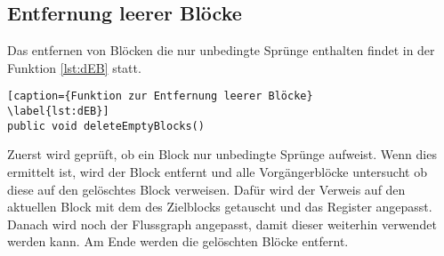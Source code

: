 \documentclass[a4paper]{article}
\begin{document}
\subsection{Entfernung leerer Blöcke}
Das entfernen von Blöcken die nur unbedingte Sprünge enthalten findet in der Funktion \ref{lst:dEB} statt.
\begin{lstlisting}[caption={Funktion zur Entfernung leerer Blöcke}
\label{lst:dEB}]
public void deleteEmptyBlocks()
\end{lstlisting}
Zuerst wird geprüft, ob ein Block nur unbedingte Sprünge aufweist.
Wenn dies ermittelt ist, wird der Block entfernt und alle Vorgängerblöcke untersucht ob diese auf den gelöschtes Block verweisen.
Dafür wird der Verweis auf den aktuellen Block mit dem des Zielblocks getauscht und das Register angepasst.
Danach wird noch der Flussgraph angepasst, damit dieser weiterhin verwendet werden kann.
Am Ende werden die gelöschten Blöcke entfernt.
\end{document}
